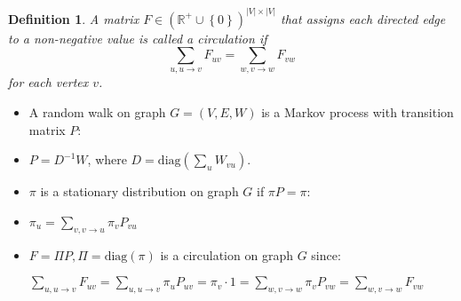 \documentclass[11pt, a4paper, landscape]{article}
\newtheorem{definition}{Definition}
\begin{document}
\NewPage{}
\small
\vfill
\begin{definition}
A matrix $F \in (\mathbb{R}^+ \cup \left\lbrace 0 \right\rbrace )^{\lvert V \rvert \times \lvert V \rvert}$ that assigns each directed edge to a non-negative value is called a circulation if
\begin{equation}
\sum\limits_{u, u \rightarrow v} F_{uv} = \sum\limits_{w, v \rightarrow w} F_{vw}
\end{equation}
for each vertex $v$.
\end{definition}
\begin{itemize}
\item A random walk on graph $G = (V, E, W)$ is a Markov process with transition matrix $P$:
\item[] 
\begin{center}
$P = D^{-1}W$, where $D = \mbox{diag}(\sum_{u}W_{vu})$.
\end{center}
\item $\pi$ is a stationary distribution on graph $G$ if $\pi P = \pi$:
\item[]
\begin{center}
$\pi_u = \sum\limits_{v, v \rightarrow u} \pi_v P_{vu}$
\end{center}
\item $F = \Pi P, \Pi = \mbox{diag}(\pi)$ is a circulation on graph $G$ since:
\begin{center}
$\sum\limits_{u, u \rightarrow v} F_{uv} = \sum\limits_{u, u \rightarrow v} \pi_u P_{uv} = \pi_v \cdot 1 = \sum\limits_{w, v \rightarrow w} \pi_v P_{vw} = \sum\limits_{w, v \rightarrow w} F_{vw}$
\end{center}
\end{itemize}
\vfill
\end{document}
